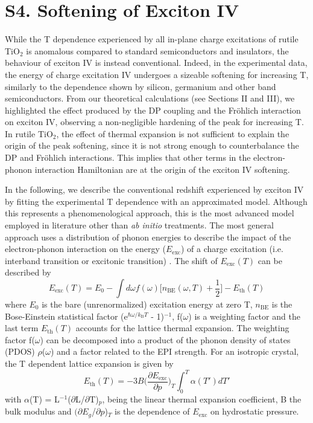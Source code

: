 \documentclass[aps,prl,twocolumn,amsfonts,nobibnotes,superscriptaddress,showpacs]{revtex4-1}
\begin{document}
\section{S4. Softening of Exciton IV}

While the T dependence experienced by all in-plane charge excitations of rutile TiO$_2$ is anomalous compared to standard semiconductors and insulators, the behaviour of exciton IV is instead conventional. Indeed, in the experimental data, the energy of charge excitation IV undergoes a sizeable softening for increasing T, similarly to the dependence shown by silicon, germanium and other band semiconductors. From our theoretical calculations (see Sections II and III), we highlighted the effect produced by the DP coupling and the Fr\"ohlich interaction on exciton IV, observing a non-negligible hardening of the peak for increasing T. In rutile TiO$_2$, the effect of thermal expansion is not sufficient to explain the origin of the peak softening, since it is not strong enough to counterbalance the DP and Fr\"ohlich interactions. This implies that other terms in the electron-phonon interaction Hamiltonian are at the origin of the exciton IV softening. 

In the following, we describe the conventional redshift experienced by exciton IV by fitting the experimental T dependence with an approximated model. Although this represents a phenomenological approach, this is the most advanced model employed in literature other than \textit{ab initio} treatments. The most general approach uses a distribution of phonon energies to describe the impact of the electron-phonon interaction on the energy ($E\mathrm{_{exc}}$) of a charge excitation (i.e. interband transition or excitonic transition) \cite{collins1990indirect}. The shift of $E\mathrm{_{exc}}(T)$ can be described by
\begin{equation}
E\mathrm{_{exc}}(T) = E_{0} - \int d\omega f(\omega) \Big[ n\mathrm{_{BE}}(\omega,T) +\frac{1}{2} \Big] - E\mathrm{_{th}}(T)
\end{equation}
where $E\mathrm{_0}$ is the bare (unrenormalized) excitation energy at zero T, $n\mathrm{_{BE}}$ is the Bose-Einstein statistical factor (e$^{\hbar\omega/k\mathrm{_B}T}$ - 1)$^{-1}$, f($\omega$) is a weighting factor and the last term $E\mathrm{_{th}}(T)$ accounts for the lattice thermal expansion. The weighting factor f($\omega$) can be decomposed into a product of the phonon density of states (PDOS) $\rho$($\omega$) and a factor related to the EPI strength. For an isotropic crystal, the T dependent lattice expansion is given by
\begin{equation}
E\mathrm{_{th}}(T) =  -3B\Bigg(\frac{\partial E\mathrm{_{exc}}}{\partial p} \Bigg)_T \int_0^T \alpha(T') dT'
\end{equation}
with  $\alpha$(T) = L$^{-1}$($\partial$L/$\partial$T)$_p$, being the linear thermal expansion coefficient, B the bulk modulus and $(\partial E_g$/$\partial p$)$_T$ is the dependence of $E\mathrm{_{exc}}$ on hydrostatic pressure.
\end{document}
